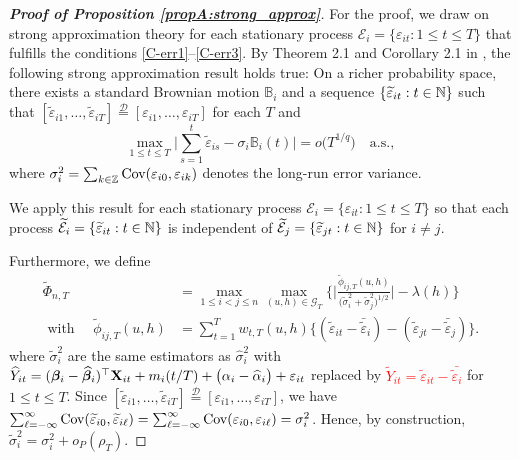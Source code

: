 \begin{proof}[\textnormal{\textbf{Proof of Proposition \ref{propA:strong_approx}}}] 
For the proof, we draw on strong approximation theory for each stationary process $\mathcal{E}_i = \{\varepsilon_{it}: 1 \leq t \leq T\}$ that fulfills the conditions \ref{C-err1}--\ref{C-err3}. By Theorem 2.1 and Corollary 2.1 in \cite{BerkesLiuWu2014}, the following strong approximation result holds true: On a richer probability space, there exists a standard Brownian motion $\mathbb{B}_i$ and a sequence $\{ \widetilde{\varepsilon}_{it}: t \in \mathbb{N} \}$ such that $[\widetilde{\varepsilon}_{i1},\ldots,\widetilde{\varepsilon}_{iT}] \stackrel{\mathcal{D}}{=} [\varepsilon_{i1},\ldots,\varepsilon_{iT}]$ for each $T$ and 
\begin{equation}\label{eq-strongapprox-dep}
\max_{1 \le t \le T} \Big| \sum\limits_{s=1}^t \widetilde{\varepsilon}_{is} - \sigma_i \mathbb{B}_i(t) \Big| = o\big( T^{1/q} \big) \quad \text{a.s.},  
\end{equation}
where $\sigma^2_i = \sum_{k \in \mathbb{Z}} \textnormal{Cov}(\varepsilon_{i0}, \varepsilon_{ik})$ denotes the long-run error variance.

We apply this result for each stationary process $\mathcal{E}_i = \{\varepsilon_{it}: 1 \leq t \leq T\}$ so that each process $\widetilde{\mathcal{E}}_i = \{\widetilde{\varepsilon}_{it}: t\in \mathbb{N}\}$ is independent of $\widetilde{\mathcal{E}}_j= \{\widetilde{\varepsilon}_{jt}: t\in \mathbb{N}\}$ for $i \neq j$.

Furthermore, we define 
\begin{align*}
\widetilde{\Phi}_{n,T} &= \max_{1 \le i < j \le n}\max_{(u,h) \in \mathcal{G}_T} \Bigg\{ \bigg|\frac{\widetilde{\phi}_{ij, T}(u,h)}{\big(\widetilde{\sigma}_i^2 + \widetilde{\sigma}_j^2 \big)^{1/2}} \bigg| - \lambda(h)\Bigg\}\\
\text{ with }\quad \widetilde{\phi}_{ij, T}(u,h) &= \sum\nolimits_{t=1}^T w_{t,T}(u,h) \big\{ (\widetilde{\varepsilon}_{it} - \bar{\widetilde{\varepsilon}}_i)  - (\widetilde{\varepsilon}_{jt} - \bar{\widetilde{\varepsilon}}_j)\big\}.
\end{align*}
where $\widetilde{\sigma}^2_i$ are the same estimators as $\widehat{\sigma}^2_i$ with $\widehat{Y}_{it} = (\bm{\beta}_i - \widehat{\bm{\beta}}_i)^\top \mathbf{X}_{it} + m_i ( t/T) + \big( \alpha_i - \widehat{\alpha}_i \big) + \varepsilon_{it}$
replaced by \textcolor{red}{$\widetilde{Y}_{it} =\widetilde{\varepsilon}_{it} - \bar{\widetilde{\varepsilon}_{i}}$}  for $1 \le t \le T$. Since $[\widetilde{\varepsilon}_{i1},\ldots,\widetilde{\varepsilon}_{iT}] \stackrel{\mathcal{D}}{=} [\varepsilon_{i1},\ldots,\varepsilon_{iT}]$, we have $\sum\nolimits_{\ell=-\infty}^{\infty} \textnormal{Cov}(\widetilde{\varepsilon}_{i0}, \widetilde{\varepsilon}_{i\ell})  = \sum\nolimits_{\ell=-\infty}^{\infty} \textnormal{Cov}(\varepsilon_{i0}, \varepsilon_{i\ell})= \sigma_i^2$. Hence, by construction, \linebreak $\widetilde{\sigma}_i^2 = \sigma_i^2 + o_P(\rho_T)$.


\end{proof}
